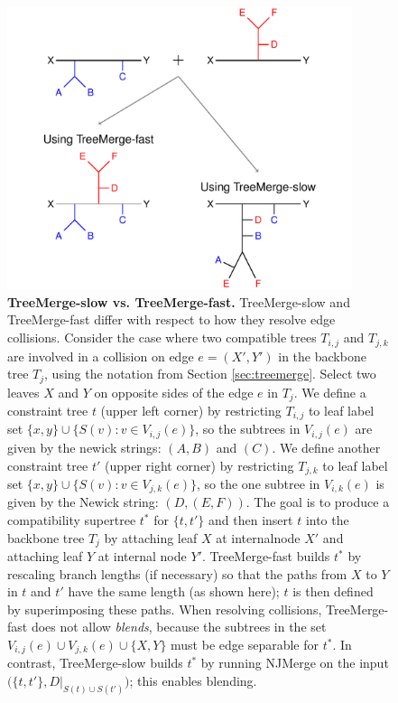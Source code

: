 \begin{figure}[!h]
\centering
\includegraphics[width=0.9\textwidth]{figures/treemerge-fig2.pdf}
\caption{
{\bf TreeMerge-slow vs. TreeMerge-fast. }
TreeMerge-slow and TreeMerge-fast differ with respect to how they resolve edge collisions.
Consider the case where two compatible trees $T_{i,j}$ and $T_{j,k}$ are involved in a collision on edge $e = (X', Y')$ in the backbone tree $T_j$, using the notation from Section \ref{sec:treemerge}.
Select two leaves $X$ and $Y$ on opposite sides of the edge $e$ in $T_j$.
We define a constraint tree $t$ (upper left corner) by restricting $T_{i,j}$ to leaf label set $\{ x, y \} \cup \{ S(v) : v \in V_{i,j}(e) \}$, 
so the subtrees in $V_{i,j}(e)$ are given by the \gls{newick} strings: $(A,B)$ and $(C)$.
We define another constraint tree $t'$ (upper right corner) by restricting $T_{j,k}$ to leaf label set $\{ x, y \} \cup \{ S(v) : v \in V_{j,k}(e) \}$, so the one subtree in $V_{i,k}(e)$ is given by the Newick string: $(D,(E,F))$.
The goal is to produce a compatibility supertree $t^*$ for $\{ t, t' \}$ and then insert $t$ into the backbone tree $T_j$ by attaching leaf $X$ at \gls{internalnode} $X'$ and attaching leaf $Y$ at internal node $Y'$.
TreeMerge-fast builds $t^*$ by rescaling branch lengths (if necessary) so that the paths from $X$ to $Y$ in $t$ and $t'$ have the same length (as shown here); $t$ is then defined by superimposing these paths.
When resolving collisions, TreeMerge-fast does not allow \textit{\glspl{blend}}, because the subtrees in the set $V_{i,j}(e) \cup V_{j,k}(e) \cup \{X, Y\}$ must be edge separable for $t^*$.
In contrast, TreeMerge-slow builds $t^*$ by running NJMerge on the input $\big(\{t, t'\}, D|_{S(t) \cup S(t')} \big)$; this enables blending.}
\label{fig:slow-vs-fast}
\end{figure}

